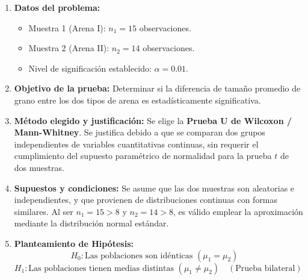 \documentclass[11pt,a4paper]{article}
\begin{document}
\begin{enumerate}
    \item \textbf{Datos del problema:}
    \begin{itemize}
        \item Muestra 1 (Arena I): $n_1 = 15$ observaciones.
        \item Muestra 2 (Arena II): $n_2 = 14$ observaciones.
        \item Nivel de significación establecido: $\alpha = 0.01$.
    \end{itemize}

    \item \textbf{Objetivo de la prueba:}
    Determinar si la diferencia de tamaño promedio de grano entre los dos tipos de arena es estadísticamente significativa.

    \item \textbf{Método elegido y justificación:}
    Se elige la \textbf{Prueba U de Wilcoxon / Mann-Whitney}. Se justifica debido a que se comparan dos grupos independientes de variables cuantitativas continuas, sin requerir el cumplimiento del supuesto paramétrico de normalidad para la prueba $t$ de dos muestras.

    \item \textbf{Supuestos y condiciones:}
    Se asume que las dos muestras son aleatorias e independientes, y que provienen de distribuciones continuas con formas similares. Al ser $n_1 = 15 > 8$ y $n_2 = 14 > 8$, es válido emplear la aproximación mediante la distribución normal estándar.

    \item \textbf{Planteamiento de Hipótesis:}
    \[ H_0: \text{Las poblaciones son idénticas } (\mu_1 = \mu_2) \quad \]
    \[ H_1: \text{Las poblaciones tienen medias distintas } (\mu_1 \neq \mu_2) \quad (\text{Prueba bilateral}) \quad \]


\end{enumerate}
\end{document}
